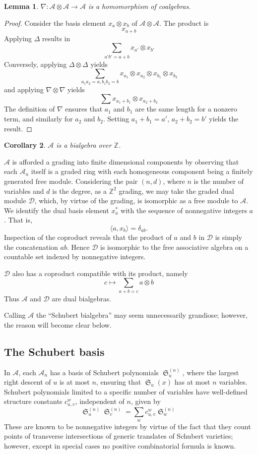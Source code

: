 \documentclass{amsart}
\newtheorem{lemma}{Lemma}[subsection]
\newtheorem{corollary}[lemma]{Corollary}
\theoremstyle{definition}
\theoremstyle{remark}
\numberwithin{equation}{subsection}
\DeclareMathOperator{\sch}{\mathfrak{S}}
\newcommand{\coma}{\mathcal{A}}
\newcommand{\dcoma}{\mathcal{D}}
\begin{document}
\begin{lemma}
	$\nabla:\coma\otimes \coma\to \coma$ is a homomorphism of coalgebras.
\end{lemma}
\begin{proof}
  Consider the basis element $x_a\otimes x_b$ of $\coma\otimes \coma$. The product is
  $$x_{a+b}$$
  Applying $\Delta$ results in
$$\sum_{a'b'=a+b} x_{a'}\otimes x_{b'}$$
Conversely, applying $\Delta\otimes \Delta$ yields
$$\sum_{a_1a_2=a,b_1b_2=b}x_{a_1}\otimes x_{a_2}\otimes x_{b_1}\otimes x_{b_2}$$
and applying $\nabla\otimes \nabla$ yields
$$\sum x_{a_1 + b_1}\otimes x_{a_2 + b_2}$$
The definition of $\nabla$ ensures that $a_1$ and $b_1$ are the same length for a nonzero term, and similarly for $a_2$ and $b_2$. Setting $a_1+b_1=a'$, $a_2+b_2=b'$ yields the result.
\end{proof}

\begin{corollary}
	$\coma$ is a bialgebra over $\mathbb{Z}$.
\end{corollary}

$\coma$ is afforded a grading into finite dimensional components by observing that each $\coma_n$ itself is a graded ring with each homogeneous component being a finitely generated free module. Considering the pair $(n, d)$, where $n$ is the number of variables and $d$ is the degree, as a $\mathbb{Z}^2$ grading, we may take the graded dual module $\dcoma$, which, by virtue of the grading, is isomorphic as a free module to $\coma$. We identify the dual basis element $x_a^*$ with the sequence of nonnegative integers $a$. That is,
$$\langle a, x_b\rangle = \delta_{ab}\text{.}$$
Inspection of the coproduct reveals that the product of $a$ and $b$ in $\dcoma$ is simply the concatenation $ab$. Hence $\dcoma$ is isomorphic to the free associative algebra on a countable set indexed by nonnegative integers.

$\dcoma$ also has a coproduct compatible with its product, namely
$$c\mapsto \sum_{a+b=c} a\otimes b$$
Thus $\coma$ and $\dcoma$ are dual bialgebras.

Calling $\coma$ the ``Schubert bialgebra'' may seem unnecessarily grandiose; however, the reason will become clear below.

\subsection{The Schubert basis}

In $\coma$, each $\coma_n$ has a basis of Schubert polynomials $\sch_u^{(n)}$, where the largest right descent of $u$ is at most $n$, ensuring that $\sch_u(x)$ has at most $n$ variables. Schubert polynomials limited to a specific number of variables have well-defined structure constants $c_{u,v}^w$, independent of $n$, given by
$$\sch_u^{(n)}\sch_v^{(n)} = \sum_{w}c_{u,v}^w\sch_w^{(n)}$$
These are known to be nonnegative integers by virtue of the fact that they count points of transverse intersections of generic translates of Schubert varieties; however, except in special cases no positive combinatorial formula is known.
\end{document}
